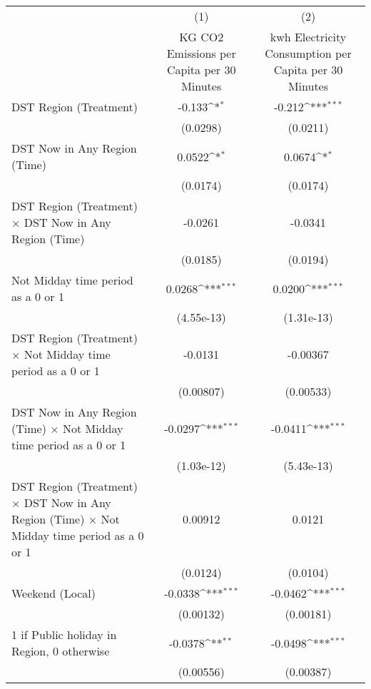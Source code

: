 {
\def\sym#1{\ifmmode^{#1}\else\(^{#1}\)\fi}
\begin{tabular}{l*{2}{c}}
\hline\hline
                    &\multicolumn{1}{c}{(1)}&\multicolumn{1}{c}{(2)}\\
                    &\multicolumn{1}{c}{KG CO2 Emissions per Capita per 30 Minutes}&\multicolumn{1}{c}{kwh Electricity Consumption per Capita per 30 Minutes}\\
\hline
DST Region (Treatment)&      -0.133\sym{*}  &      -0.212\sym{***}\\
                    &    (0.0298)         &    (0.0211)         \\
[1em]
DST Now in Any Region (Time)&      0.0522\sym{*}  &      0.0674\sym{*}  \\
                    &    (0.0174)         &    (0.0174)         \\
[1em]
DST Region (Treatment) $\times$ DST Now in Any Region (Time)&     -0.0261         &     -0.0341         \\
                    &    (0.0185)         &    (0.0194)         \\
[1em]
Not Midday time period as a 0 or 1&      0.0268\sym{***}&      0.0200\sym{***}\\
                    &  (4.55e-13)         &  (1.31e-13)         \\
[1em]
DST Region (Treatment) $\times$ Not Midday time period as a 0 or 1&     -0.0131         &    -0.00367         \\
                    &   (0.00807)         &   (0.00533)         \\
[1em]
DST Now in Any Region (Time) $\times$ Not Midday time period as a 0 or 1&     -0.0297\sym{***}&     -0.0411\sym{***}\\
                    &  (1.03e-12)         &  (5.43e-13)         \\
[1em]
DST Region (Treatment) $\times$ DST Now in Any Region (Time) $\times$ Not Midday time period as a 0 or 1&     0.00912         &      0.0121         \\
                    &    (0.0124)         &    (0.0104)         \\
[1em]
Weekend (Local)     &     -0.0338\sym{***}&     -0.0462\sym{***}\\
                    &   (0.00132)         &   (0.00181)         \\
[1em]
1 if Public holiday in Region, 0 otherwise&     -0.0378\sym{**} &     -0.0498\sym{***}\\
                    &   (0.00556)         &   (0.00387)         \\

\end{tabular}}
